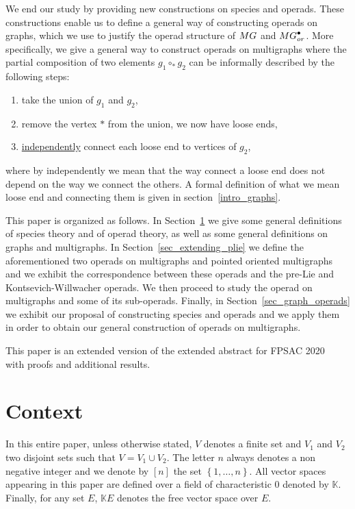 \documentclass[11pt]{article}
\theoremstyle{definition}
\numberwithin{equation}{section}
\newcommand{\set}[1]{\left\{#1\right\}}
\newcommand{\spe}[1]{\normalfont{\textsc{#1}}}
\newcommand{\K}{\mathbb{K}}
\newcommand{\point}[1]{#1^{\bullet}}
\newcommand{\comp}[1][\ast]{\circ_{#1}}
\newcommand{\MG}{\spe{MG}}
\begin{document}
We end our study by providing new constructions on species and operads. These constructions enable us 
to define a general way of constructing operads on graphs, which we use to justify the operad structure 
of $\MG$ and $\point{\MG}_{or}$. More specifically, we give a general way to construct operads on 
multigraphs where the partial composition of two elements $g_1\comp g_2$ can be informally described 
by the following steps:
\begin{enumerate}
    \item take the union of $g_1$ and $g_2$,
    \item remove the vertex $\ast$ from the union, we now have loose ends,
    \item \underline{independently} connect each loose end to vertices of $g_2$,
\end{enumerate}
where by independently we mean that the way connect a loose end does not depend on the 
way we connect the others. A formal definition of what we mean loose end and connecting them
is given in section~\ref{intro_graphs}.

This paper is organized as follows. In Section~\ref{sec_intro} we give some general definitions of
species theory and of operad theory, as well as some general definitions on graphs and multigraphs. 
In Section~\ref{sec_extending_plie} we define the aforementioned two operads on multigraphs and 
pointed oriented multigraphs and we exhibit the correspondence between these operads and the pre-Lie 
and Kontsevich-Willwacher operads. We then proceed to study the operad on multigraphs and some of its 
sub-operads. Finally, in Section~\ref{sec_graph_operads} we exhibit our proposal of constructing species 
and operads and we apply them in order to obtain our general construction of operads on multigraphs.

This paper is an extended version of the extended abstract for FPSAC 2020~\cite{AGKT20} with proofs and 
additional results.





\section{Context}\label{sec_intro}
In this entire paper, unless otherwise stated, $V$ denotes a finite set and $V_1$ and $V_2$ two disjoint 
sets such that $V=V_1\cup V_2$. The letter $n$ always denotes a non negative integer and we denote by $[n]$ 
the set $\set{1,\dots, n}$. All vector spaces appearing in this paper are defined over a field of 
characteristic 0 denoted by $\K$. Finally, for any set $E$, $\K E$ denotes the free vector space over $E$.
\end{document}
